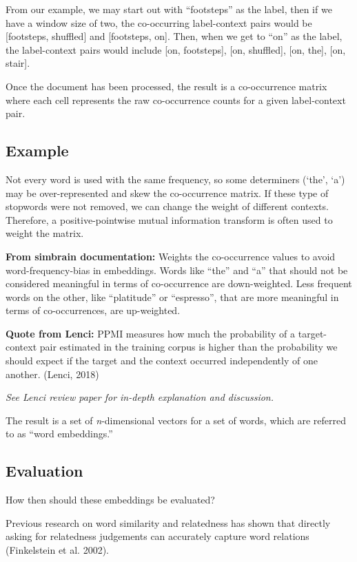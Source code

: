 From our example, we may start out with ``footsteps'' as the label, then if we have a window size of two, the co-occurring label-context pairs would be [footsteps, shuffled] and [footsteps, on].
Then, when we get to ``on'' as the label, the label-context pairs would include [on, footsteps], [on, shuffled], [on, the], [on, stair].

Once the document has been processed, the result is a co-occurrence matrix where each cell represents the raw co-occurrence counts for a given label-context pair.

\subsection{Example}

Not every word is used with the same frequency, so some determiners (`the', `a') may be over-represented and skew the co-occurrence matrix. If these type of stopwords were not removed, we can change the weight of different contexts. Therefore, a positive-pointwise mutual information transform is often used to weight the matrix. 

\textbf{From simbrain documentation:} Weights the co-occurrence values to avoid word-frequency-bias in embeddings. Words like ``the'' and ``a'' that should not be considered meaningful in terms of co-occurrence are down-weighted. Less frequent words on the other, like ``platitude'' or ``espresso'', that are more meaningful in terms of co-occurrences, are up-weighted.

\textbf{Quote from Lenci:} PPMI measures how much the probability of a target-context pair estimated in the training corpus is higher than the probability we should expect if the target and the context occurred independently of one another. (Lenci, 2018)

\textit{See Lenci review paper for in-depth explanation and discussion.}

The result is a set of \textit{n}-dimensional vectors for a set of words, which are referred to as ``word embeddings.''

\subsection{Evaluation}

How then should these embeddings be evaluated? 

Previous research on word similarity and relatedness has shown that directly asking for relatedness judgements can accurately capture word relations (Finkelstein et al. 2002).

